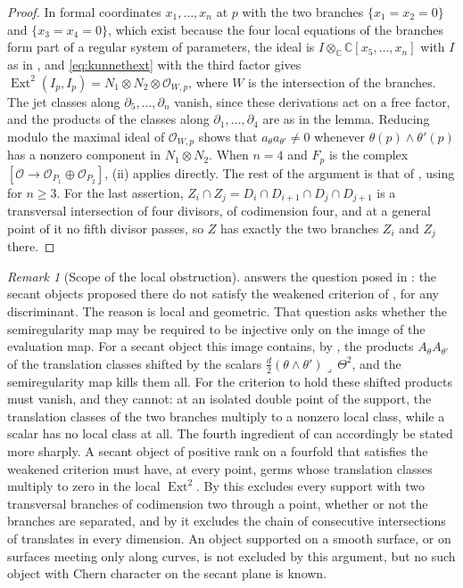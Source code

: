 \documentclass[11pt,reqno]{amsart}
\theoremstyle{plain}
\theoremstyle{definition}
\theoremstyle{remark}
\newtheorem{remark}[theorem]{Remark}
\newcommand{\CC}{\mathbb{C}}
\newcommand{\cO}{\mathcal{O}}
\DeclareMathOperator{\Ext}{Ext}
\begin{document}
\begin{proof}
In formal coordinates $x_{1},\dots,x_{n}$ at $p$ with the two branches
$\{x_{1}=x_{2}=0\}$ and $\{x_{3}=x_{4}=0\}$, which exist because the four
local equations of the branches form part of a regular system of
parameters, the ideal is
$I\otimes_{\CC}\CC[x_{5},\dots,x_{n}]$ with $I$ as in ,
and \eqref{eq:kunnethext} with the third factor gives
$\Ext^{2}(I_{p},I_{p})=N_{1}\otimes N_{2}\otimes\cO_{W,p}$, where $W$ is the
intersection of the branches. The jet classes along $\partial_{5},\dots,\partial_{n}$
vanish, since these derivations act on a free factor, and the products of the
classes along $\partial_{1},\dots,\partial_{4}$ are as in the lemma. Reducing
modulo the maximal ideal of $\cO_{W,p}$ shows that $a_{\theta}a_{\theta'}\ne0$
whenever $\theta(p)\wedge\theta'(p)$ has a nonzero component in
$N_{1}\otimes N_{2}$. When $n=4$ and $F_{p}$ is the complex
$[\cO\to\cO_{P_{1}}\oplus\cO_{P_{2}}]$, (ii) applies
directly. The rest of the argument is that of
, using  for $n\ge3$. For the last
assertion, $Z_{i}\cap Z_{j}=D_{i}\cap D_{i+1}\cap D_{j}\cap D_{j+1}$ is a
transversal intersection of four divisors, of codimension four, and at a
general point of it no fifth divisor passes, so $Z$ has exactly the two
branches $Z_{i}$ and $Z_{j}$ there.
\end{proof}

\begin{remark}[Scope of the local obstruction]\label{rem:candidatemeaning}
 answers the question posed in
\cite[Section 12]{Mar25b}: the secant objects proposed there do not satisfy
the weakened criterion of \cite[Question 11.4]{Mar25b}, for any
discriminant. The reason is local and geometric. That question asks whether
the semiregularity map may be required to be injective only on the image of
the evaluation map. For a secant object this image contains, by
, the products $A_{\theta}A_{\theta'}$ of the translation
classes shifted by the scalars
$\tfrac d2(\theta\wedge\theta')\lrcorner\,\Theta^{2}$, and the
semiregularity map kills them all. For the criterion to hold these shifted
products must vanish, and they cannot: at an isolated double point of the
support, the translation classes of the two branches multiply to a nonzero
local class, while a scalar has no local class at all. The fourth ingredient
of \cite[Remark~14.16]{paperI} can accordingly be stated more sharply. A secant
object of positive rank on a fourfold that satisfies the weakened criterion
must have, at every point, germs whose translation classes multiply to zero
in the local $\Ext^{2}$. By  this excludes every
support with two transversal branches of codimension two through a point,
whether or not the branches are separated, and by
 it excludes the chain of consecutive
intersections of translates in every dimension. An object supported on a
smooth surface, or on surfaces meeting only along curves, is not excluded by
this argument, but no such object with Chern character on the secant plane
is known.
\end{remark}
\end{document}
